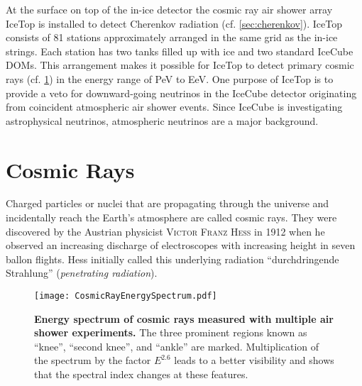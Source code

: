 At the surface on top of the in-ice detector the cosmic ray air shower array IceTop is installed to detect Cherenkov radiation (cf. \ref{sec:cherenkov}). IceTop consists of 81 stations approximately arranged in the same grid as the in-ice strings. Each station has two tanks filled up with ice and two standard IceCube DOMs. This arrangement makes it possible for IceTop to detect primary cosmic rays (cf. \ref{sec:cosmicrays}) in the energy range of \si{\peta\electronvolt} to \si{\exa\electronvolt}. One purpose of IceTop is to provide a veto for downward-going neutrinos in the IceCube detector originating from coincident atmospheric air shower events. \cite{icecube:instrumentation} Since IceCube is investigating astrophysical neutrinos, atmospheric neutrinos are a major background.



\section{Cosmic Rays}\label{sec:cosmicrays}

Charged particles or nuclei that are propagating through the universe and incidentally reach the Earth's atmosphere are called cosmic rays. They were discovered by the Austrian physicist \textsc{Victor Franz Hess} in 1912 when he observed an increasing discharge of electroscopes with increasing height in seven ballon flights. \cite{cosmicrays:hess} Hess initially called this underlying radiation \enquote{durchdringende Strahlung} (\textit{penetrating radiation}).

\begin{figure}[h]
	\texttt{[image: CosmicRayEnergySpectrum.pdf]}
	\caption[Cosmic ray energy spectrum]{\textbf{Energy spectrum of cosmic rays measured with multiple air shower experiments.} \cite[adapted]{cosmicrays:gaisser} The three prominent regions known as \enquote{knee}, \enquote{second knee}, and \enquote{ankle} are marked. Multiplication of the spectrum by the factor $E^{2.6}$ leads to a better visibility and shows that the spectral index changes at these features.}
	\label{cosmicrays:spectrum}	
\end{figure}


